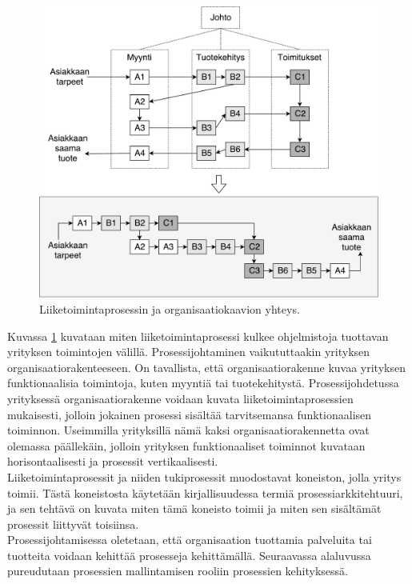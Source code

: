 \documentclass[finnish,12pt,a4paper,pdftex]{article}
\begin{document}
\begin{figure}[!h]
    \centering
    \includegraphics[scale=0.45]{images/Prosessikaavion.pdf}
    \caption{Liiketoimintaprosessin ja organisaatiokaavion yhteys. \citep{ohjelmistotuotanto}}
    \label{fig:liikark}
\end{figure}

\noindent Kuvassa \ref{fig:liikark} kuvataan miten liiketoimintaprosessi kulkee ohjelmistoja tuottavan yrityksen toimintojen välillä. Prosessijohtaminen vaikututtaakin yrityksen organisaatiorakenteeseen. On tavallista, että organisaatiorakenne kuvaa yrityksen funktionaalisia toimintoja, kuten myyntiä tai tuotekehitystä. Prosessijohdetussa yrityksessä organisaatiorakenne voidaan kuvata liiketoimintaprosessien mukaisesti, jolloin jokainen prosessi sisältää tarvitsemansa funktionaalisen toiminnon. Useimmilla yrityksillä nämä kaksi organisaatiorakennetta ovat olemassa päällekäin, jolloin yrityksen funktionaaliset toiminnot kuvataan horisontaalisesti ja prosessit vertikaalisesti. \citep{vanhatorre}\\

\noindent Liiketoimintaprosessit ja niiden tukiprosessit muodostavat koneiston, jolla yritys toimii. Tästä koneistosta käytetään kirjallisuudessa termiä prosessiarkkitehtuuri, ja sen tehtävä on kuvata miten tämä koneisto toimii ja miten sen sisältämät prosessit liittyvät toisiinsa.\\

\noindent Prosessijohtamisessa oletetaan, että organisaation tuottamia palveluita tai tuotteita voidaan kehittää prosesseja kehittämällä. Seuraavassa alaluvussa pureudutaan prosessien mallintamisen rooliin prosessien kehityksessä.
\end{document}
